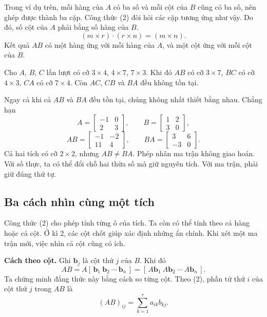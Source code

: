 \documentclass[12pt,a4paper]{article}
\begin{document}
Trong ví dụ trên, mỗi hàng của \(A\) có ba số và mỗi cột của \(B\) cũng có ba số, nên ghép được thành ba cặp. Công thức (2) đòi hỏi các cặp tương ứng như vậy. Do đó, số cột của \(A\) phải bằng số hàng của \(B\).
$$
(m\times r)\cdot(r\times n)=(m\times n). \tag{3}
$$
Kết quả \(AB\) có một hàng ứng với mỗi hàng của \(A\), và một cột ứng với mỗi cột của \(B\).

Cho \(A\), \(B\), \(C\) lần lượt có cỡ \(3\times4\), \(4\times7\), \(7\times3\). Khi đó \(AB\) có cỡ \(3\times7\), \(BC\) có cỡ \(4\times3\), \(CA\) có cỡ \(7\times4\). Còn \(AC\), \(CB\) và \(BA\) đều không tồn tại.

Ngay cả khi cả \(AB\) và \(BA\) đều tồn tại, chúng không nhất thiết bằng nhau. Chẳng hạn
$$
A=\left[ \begin{array}{rr} -1 & 0\\ 2 & 3 \end{array} \right],\qquad
B=\left[ \begin{array}{rr} 1 & 2\\ 3 & 0 \end{array} \right],
$$
$$
AB=\left[ \begin{array}{rr} -1 & -2\\ 11 & 4 \end{array} \right],\qquad
BA=\left[ \begin{array}{rr} 3 & 6\\ -3 & 0 \end{array} \right].
$$
Cả hai tích có cỡ \(2\times2\), nhưng \(AB\neq BA\). Phép nhân ma trận không giao hoán. Với số thực, ta có thể đổi chỗ hai thừa số mà giữ nguyên tích. Với ma trận, phải giữ đúng thứ tự.

\subsection{Ba cách nhìn cùng một tích}

Công thức (2) cho phép tính từng ô của tích. Ta còn có thể tính theo cả hàng hoặc cả cột. Ở kì 2, các cột chốt giúp xác định những ẩn chính. Khi xét một ma trận mới, việc nhìn cả cột cũng có ích.

\textbf{Cách theo cột.} Ghi \(\mathbf{b}_j\) là cột thứ \(j\) của \(B\). Khi đó
$$
AB=A[\,\mathbf{b}_1\ \mathbf{b}_2\ \cdots\ \mathbf{b}_n\,]
=[\,A\mathbf{b}_1\ A\mathbf{b}_2\ \cdots\ A\mathbf{b}_n\,]. \tag{4}
$$
Ta chứng minh đẳng thức này bằng cách so từng cột. Theo (2), phần tử thứ \(i\) của cột thứ \(j\) trong \(AB\) là
$$
(AB)_{ij}=\sum_{k=1}^{r}a_{ik}b_{kj}.
$$
\end{document}
